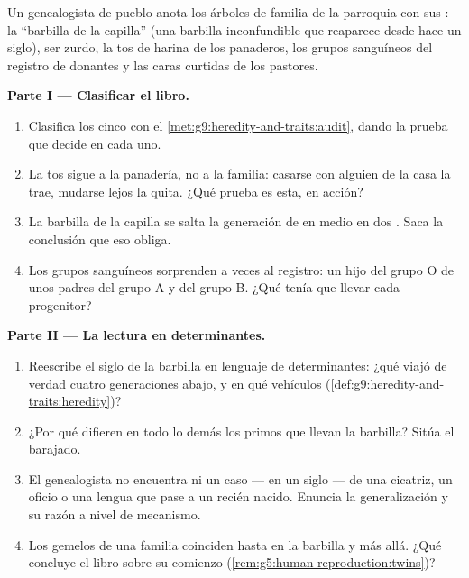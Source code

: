 \begin{problem}\label{pb:g9:heredity-and-traits:1}
Un genealogista de pueblo anota los árboles de familia de la parroquia
con sus : la ``barbilla de la capilla'' (una barbilla
inconfundible que reaparece desde hace un siglo), ser zurdo, la tos de
harina de los panaderos, los grupos sanguíneos del registro de
donantes y las caras curtidas de los pastores.

\medskip\noindent\textbf{Parte I --- Clasificar el
libro.}
\begin{enumerate}
  \item Clasifica los cinco  con el
        \cref{met:g9:heredity-and-traits:audit}, dando la prueba que
        decide en cada uno.
  \item La tos sigue a la panadería, no a la familia: casarse con
        alguien de la casa la trae, mudarse lejos la quita. ¿Qué prueba
        es esta, en acción?
  \item La barbilla de la capilla se salta la generación de en medio en
        dos . Saca la conclusión que eso obliga.
  \item Los grupos sanguíneos sorprenden a veces al registro: un hijo
        del grupo O de unos padres del grupo A y del grupo B. ¿Qué
        tenía que llevar cada progenitor?
\end{enumerate}

\medskip\noindent\textbf{Parte II --- La lectura en
determinantes.}
\begin{enumerate}[resume]
  \item Reescribe el siglo de la barbilla en lenguaje de
        determinantes: ¿qué viajó de verdad cuatro generaciones abajo,
        y en qué vehículos
        (\cref{def:g9:heredity-and-traits:heredity})?
  \item ¿Por qué difieren en todo lo demás los primos que llevan la
        barbilla? Sitúa el barajado.
  \item El genealogista no encuentra ni un caso --- en un siglo --- de
        una cicatriz, un oficio o una lengua que pase a un recién
        nacido. Enuncia la generalización y su razón a nivel de
        mecanismo.
  \item Los gemelos de una familia coinciden hasta en la barbilla y más
        allá. ¿Qué concluye el libro sobre su comienzo
        (\cref{rem:g5:human-reproduction:twins})?
\end{enumerate}


\end{problem}

